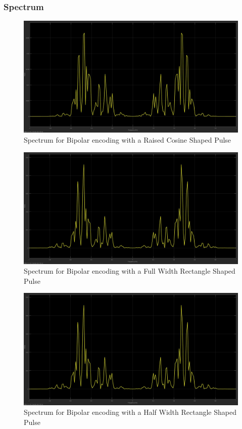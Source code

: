 \documentclass{article}
\begin{document}
\subsubsection{Spectrum}
\begin{figure}[H]
  \includegraphics[width = \linewidth]{BP_Raised_Spectrum.jpg}
  \caption{Spectrum for Bipolar encoding with a Raised Cosine Shaped Pulse}
  \label{fig:BP-Raised-Spectrum}
\end{figure}
\begin{figure}[H]
  \includegraphics[width = \linewidth]{BP_Rect_F_Spectrum.jpg}
  \caption{Spectrum for Bipolar encoding with a Full Width Rectangle Shaped Pulse}
  \label{fig:BP-Rect-F-Spectrum}
\end{figure}
\begin{figure}[H]
  \includegraphics[width = \linewidth]{BP_Rect_H_Spectrum.jpg}
  \caption{Spectrum for Bipolar encoding with a Half Width Rectangle Shaped Pulse}
  \label{fig:BP-Rect-H-Spectrum}
\end{figure}
\end{document}
